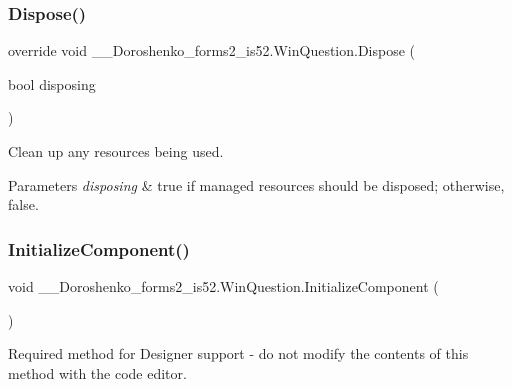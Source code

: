 \subsubsection{\texorpdfstring{Dispose()}{Dispose()}}
{\footnotesize\ttfamily override void \+\_\+\_\+\+Doroshenko\+\_\+forms2\+\_\+is52.\+Win\+Question.\+Dispose (\begin{DoxyParamCaption}\item[{bool}]{disposing }\end{DoxyParamCaption})\hspace{0.3cm}{\ttfamily [protected]}}



Clean up any resources being used. 


\begin{DoxyParams}{Parameters}
{\em disposing} & true if managed resources should be disposed; otherwise, false.\\
\hline
\end{DoxyParams}
\hypertarget{class__7___doroshenko__forms2__is52_1_1_win_question_aaec60c526c71252de0eb231ee16a876c}{}\label{class__7___doroshenko__forms2__is52_1_1_win_question_aaec60c526c71252de0eb231ee16a876c} 
\subsubsection{\texorpdfstring{Initialize\+Component()}{InitializeComponent()}}
{\footnotesize\ttfamily void \+\_\+\_\+\+Doroshenko\+\_\+forms2\+\_\+is52.\+Win\+Question.\+Initialize\+Component (\begin{DoxyParamCaption}{ }\end{DoxyParamCaption})\hspace{0.3cm}{\ttfamily [private]}}



Required method for Designer support -\/ do not modify the contents of this method with the code editor. 

